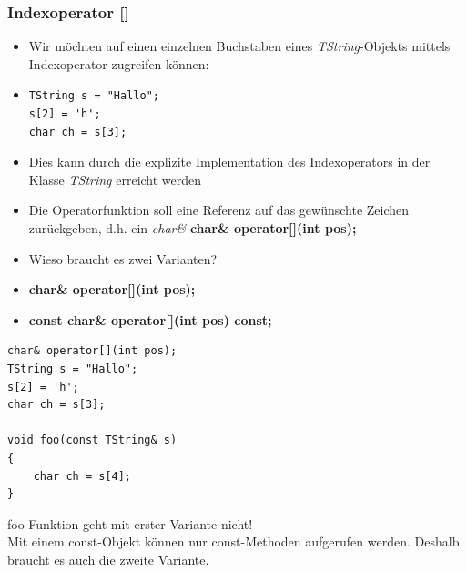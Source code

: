 \begin{multicols}{2}
\subsubsection{Indexoperator []}
\begin{itemize}
	\item Wir möchten auf einen einzelnen Buchstaben eines \emph{TString}-Objekts mittels Indexoperator zugreifen können:
	\item[\-]\vspace{-\baselineskip}\begin{minipage}{\linewidth}
\begin{lstlisting}
TString s = "Hallo";
s[2] = 'h';
char ch = s[3];
\end{lstlisting}
	\end{minipage}
	\item Dies kann durch die explizite Implementation des Indexoperators in der Klasse \emph{TString} erreicht werden
	\item Die Operatorfunktion soll eine Referenz auf das gewünschte Zeichen zurückgeben, d.h. ein \emph{char\&}
	\subitem \textbf{char\& operator[](int pos);}
	\item Wieso braucht es zwei Varianten?
	\item[\-] \textbf{char\& operator[](int pos);}
	\item[\-] \textbf{const char\& operator[](int pos) const;}
\end{itemize}
\vfill\null
\columnbreak
\vspace{-\baselineskip}
\begin{minipage}{\linewidth}
\begin{lstlisting}
char& operator[](int pos);
TString s = "Hallo";
s[2] = 'h';
char ch = s[3];

void foo(const TString& s)	
{
	char ch = s[4];
}
\end{lstlisting}
\end{minipage}
\color{red}foo-Funktion geht mit erster Variante nicht!\color{black}\\Mit einem const-Objekt können nur const-Methoden aufgerufen werden. Deshalb braucht es auch die zweite Variante.
\end{multicols}

